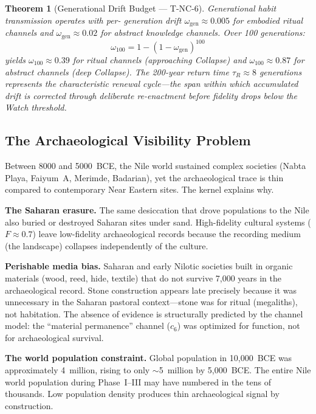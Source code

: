 \documentclass[
  aps,
  prd,
  twocolumn,
  superscriptaddress,
  nofootinbib,
  floatfix
]{revtex4-2}
\newtheorem{theorem}{Theorem}
\newcommand{\tR}{\tau_{\!R}}
\newcommand{\beq}{\begin{equation}}
\newcommand{\eeq}{\end{equation}}
\begin{document}
\begin{theorem}[Generational Drift Budget ---
T-NC-6]\label{thm:drift}
Generational habit transmission operates with per-
generation drift $\omega_{\mathrm{gen}} \approx 0.005$
for embodied ritual channels and
$\omega_{\mathrm{gen}} \approx 0.02$ for abstract
knowledge channels.  Over 100 generations:
\beq
\omega_{100} = 1 - (1 - \omega_{\mathrm{gen}})^{100}
\eeq
yields $\omega_{100} \approx 0.39$ for
ritual channels (approaching Collapse) and
$\omega_{100} \approx 0.87$ for abstract channels
(deep Collapse).  The 200-year return time
$\tR \approx 8$ generations represents the
characteristic renewal cycle---the span within which
accumulated drift is corrected through deliberate
re-enactment before fidelity drops below the Watch
threshold.
\end{theorem}


\subsection{The Archaeological Visibility
Problem}\label{sec:visibility}

Between 8000 and 5000~BCE, the Nile world sustained
complex societies (Nabta Playa, Faiyum~A, Merimde,
Badarian), yet the archaeological trace is thin
compared to contemporary Near Eastern sites.  The
kernel explains why.

\textbf{The Saharan erasure.}  The same desiccation
that drove populations to the Nile also buried or
destroyed Saharan sites under sand.  High-fidelity
cultural systems ($F \approx 0.7$) leave low-fidelity
archaeological records because the recording medium
(the landscape) collapses independently of the culture.

\textbf{Perishable media bias.}  Saharan and early
Nilotic societies built in organic materials (wood,
reed, hide, textile) that do not survive 7,000 years
in the archaeological record.  Stone construction
appears late precisely because it was unnecessary in
the Saharan pastoral context---stone was for ritual
(megaliths), not habitation.  The absence of evidence
is structurally predicted by the channel model: the
``material permanence'' channel ($c_6$) was optimized
for function, not for archaeological survival.

\textbf{The world population constraint.}  Global
population in 10,000~BCE was approximately 4~million,
rising to only $\sim$5~million by 5,000~BCE.  The
entire Nile world population during Phase~I--III may
have numbered in the tens of thousands.  Low
population density produces thin archaeological
signal by construction.
\end{document}

